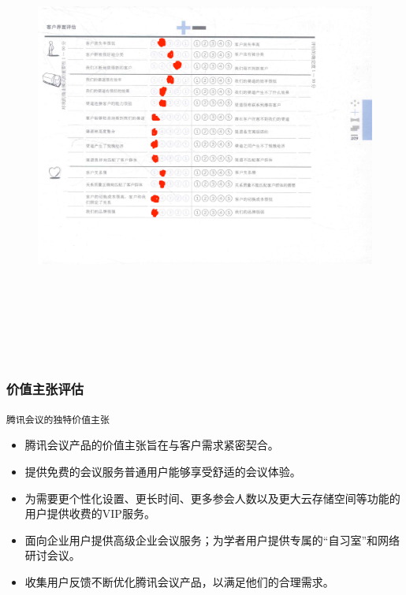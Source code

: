 \documentclass[a4paper,12pt]{article}
\begin{document}
    \begin{figure}[htbp]
        \centering
        \includegraphics[width=20cm,height=15cm]{png/S&W3}
    \end{figure}
    \clearpage %
    \subsubsection{价值主张评估}
    \texttt{腾讯会议的独特价值主张}

\begin{itemize}
  \item 腾讯会议产品的价值主张旨在与客户需求紧密契合。
  
  \item 提供免费的会议服务普通用户能够享受舒适的会议体验。
  
  \item 为需要更个性化设置、更长时间、更多参会人数以及更大云存储空间等功能的用户提供收费的VIP服务。
  
  \item 面向企业用户提供高级企业会议服务；为学者用户提供专属的“自习室”和网络研讨会议。
  
  \item 收集用户反馈不断优化腾讯会议产品，以满足他们的合理需求。
\end{itemize}
\end{document}
